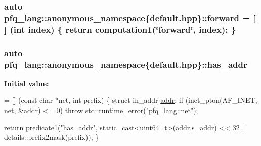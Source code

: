 \hypertarget{namespacepfq__lang_1_1anonymous__namespace_02default_8hpp_03_a7fbe4b2614dd240727bf1696b4d06523}{
\subsubsection[{forward}]{\setlength{\rightskip}{0pt plus 5cm}auto pfq\-\_\-lang\-::anonymous\-\_\-namespace\{default.\-hpp\}\-::forward = \mbox{[}$\,$\mbox{]} (int index) \{ return {\bf computation1}(\char`\"{}forward\char`\"{}, index); \}}}\label{namespacepfq__lang_1_1anonymous__namespace_02default_8hpp_03_a7fbe4b2614dd240727bf1696b4d06523}
\hypertarget{namespacepfq__lang_1_1anonymous__namespace_02default_8hpp_03_ac3ef3eefe441b183db012637b4459836}{
\subsubsection[{has\-\_\-addr}]{\setlength{\rightskip}{0pt plus 5cm}auto pfq\-\_\-lang\-::anonymous\-\_\-namespace\{default.\-hpp\}\-::has\-\_\-addr}}\label{namespacepfq__lang_1_1anonymous__namespace_02default_8hpp_03_ac3ef3eefe441b183db012637b4459836}
{\bfseries Initial value\-:}
\begin{DoxyCode}
= [] (\textcolor{keyword}{const} \textcolor{keywordtype}{char} *net, \textcolor{keywordtype}{int} prefix)
        \{
            \textcolor{keyword}{struct }in\_addr \hyperlink{namespacepfq__lang_1_1anonymous__namespace_02default_8hpp_03_aafce8334d1be83bff9a2115439c8c453}{addr};
            \textcolor{keywordflow}{if} (inet\_pton(AF\_INET, net, &\hyperlink{namespacepfq__lang_1_1anonymous__namespace_02default_8hpp_03_aafce8334d1be83bff9a2115439c8c453}{addr}) <= 0)
                \textcolor{keywordflow}{throw} std::runtime\_error(\textcolor{stringliteral}{"pfq\_lang::net"});

            \textcolor{keywordflow}{return} \hyperlink{namespacepfq__lang_ae23a03cee94b5ddfde4a8d2e5c521f0e}{predicate1}(\textcolor{stringliteral}{"has\_addr"}, static\_cast<uint64\_t>(\hyperlink{namespacepfq__lang_1_1anonymous__namespace_02default_8hpp_03_aafce8334d1be83bff9a2115439c8c453}{addr}.s\_addr) << 32 | 
      details::prefix2mask(prefix));
        \}
\end{DoxyCode}
